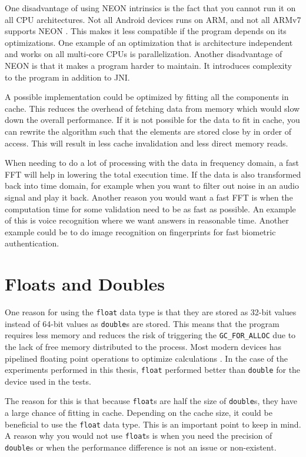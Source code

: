 
One disadvantage of using NEON intrinsics is the fact that you cannot run it on all CPU architectures. Not all Android devices runs on ARM, and not all ARMv7 supports NEON \cite{arm:neon}. This makes it less compatible if the program depends on its optimizations. One example of an optimization that is architecture independent and works on all multi-core CPUs is parallelization. Another disadvantage of NEON is that it makes a program harder to maintain. It introduces complexity to the program in addition to JNI. 

A possible implementation could be optimized by fitting all the components in cache. This reduces the overhead of fetching data from memory which would slow down the overall performance. If it is not possible for the data to fit in cache, you can rewrite the algorithm such that the elements are stored close by in order of access. This will result in less cache invalidation and less direct memory reads.

When needing to do a lot of processing with the data in frequency domain, a fast FFT will help in lowering the total execution time. If the data is also transformed back into time domain, for example when you want to filter out noise in an audio signal and play it back. Another reason you would want a fast FFT is when the computation time for some validation need to be as fast as possible. An example of this is voice recognition where we want answers in reasonable time. Another example could be to do image recognition on fingerprints for fast biometric authentication.

\section{Floats and Doubles}
One reason for using the \texttt{float} data type is that they are stored as 32-bit values instead of 64-bit values as \texttt{double}s are stored. This means that the program requires less memory and reduces the risk of triggering the \texttt{GC\_FOR\_ALLOC} due to the lack of free memory distributed to the process. Most modern devices has pipelined floating point operations to optimize calculations \cite{android:float}. In the case of the experiments performed in this thesis, \texttt{float} performed better than \texttt{double} for the device used in the tests.

The reason for this is that because \texttt{float}s are half the size of \texttt{double}s, they have a large chance of fitting in cache. Depending on the cache size, it could be beneficial to use the \texttt{float} data type. This is an important point to keep in mind. A reason why you would not use \texttt{float}s is when you need the precision of \texttt{double}s or when the performance difference is not an issue or non-existent.

